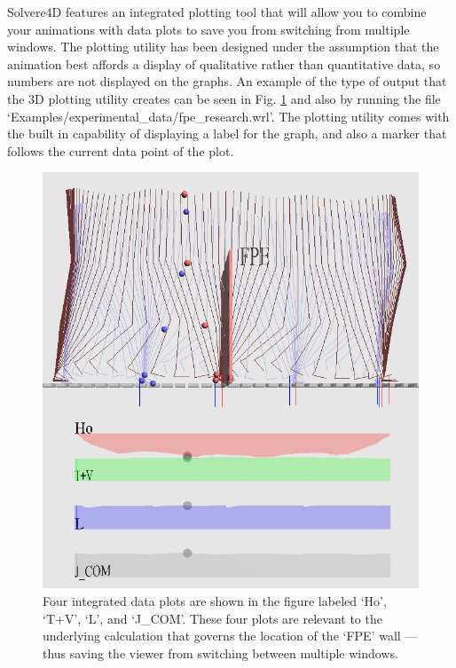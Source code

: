 \documentclass[singlecolumn,12pt]{article}
\begin{document}
Solvere4D features an integrated plotting tool that will allow you
to combine your animations with data plots to save you from
switching from multiple windows. The plotting utility has been
designed under the assumption that the animation best affords a
display of qualitative rather than quantitative data, so numbers are
not displayed on the graphs. An example of the type of output that
the 3D plotting utility creates can be seen in Fig.
\ref{fig_expData} and also by running the file
`Examples/experimental\_data/fpe\_research.wrl'. The plotting
utility comes with the built in capability of displaying a label for
the graph, and also a marker that follows the current data point of
the plot.


\begin{figure}[!h]
\includegraphics[width = \textwidth, height = 0.5\textheight, keepaspectratio= true]{fig_expData}
\caption{Four integrated data plots are shown in the figure labeled
`Ho', `T+V', `L', and `J\_COM'. These four plots are relevant to the
underlying calculation that governs the location of the `FPE' wall
--- thus saving the viewer from switching between multiple windows. \label{fig_expData}}
\end{figure}
\end{document}
